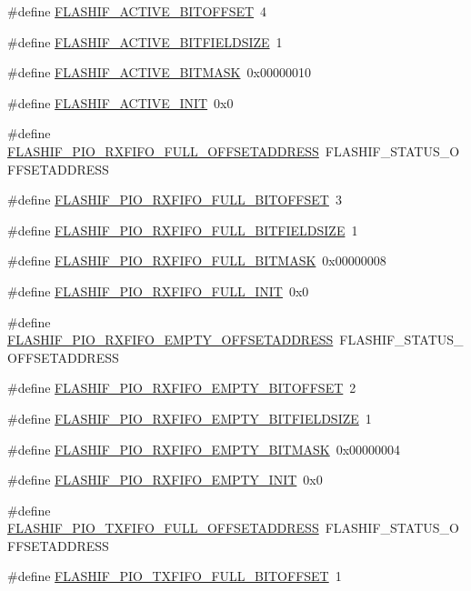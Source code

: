 \begin{DoxyCompactItemize}
\#define \hyperlink{a00552_acd738e4739f379e0dfe20a08b1a85a6b}{FLASHIF\_\-ACTIVE\_\-BITOFFSET}~4
\item 
\#define \hyperlink{a00552_ade782b81873774e78876fd84bc324984}{FLASHIF\_\-ACTIVE\_\-BITFIELDSIZE}~1
\item 
\#define \hyperlink{a00552_a96545928f0380808d4f094cb2ef87830}{FLASHIF\_\-ACTIVE\_\-BITMASK}~0x00000010
\item 
\#define \hyperlink{a00552_a4b7772e82adcff023ef6b6462452421b}{FLASHIF\_\-ACTIVE\_\-INIT}~0x0
\item 
\#define \hyperlink{a00552_a6aa4b02fe9a5eb7f485c61a8fe6ae998}{FLASHIF\_\-PIO\_\-RXFIFO\_\-FULL\_\-OFFSETADDRESS}~FLASHIF\_\-STATUS\_\-OFFSETADDRESS
\item 
\#define \hyperlink{a00552_a31379635fdfba4d57c5cf25757779291}{FLASHIF\_\-PIO\_\-RXFIFO\_\-FULL\_\-BITOFFSET}~3
\item 
\#define \hyperlink{a00552_ad5d64cb86f79fcdd6a4cbf1894a93574}{FLASHIF\_\-PIO\_\-RXFIFO\_\-FULL\_\-BITFIELDSIZE}~1
\item 
\#define \hyperlink{a00552_a8981b79bbe367e5bc38a5d7c4f66a2b2}{FLASHIF\_\-PIO\_\-RXFIFO\_\-FULL\_\-BITMASK}~0x00000008
\item 
\#define \hyperlink{a00552_a905ec907ee4f3e07b34b214d3a3727b5}{FLASHIF\_\-PIO\_\-RXFIFO\_\-FULL\_\-INIT}~0x0
\item 
\#define \hyperlink{a00552_aef706d52a4dc7b2dc37746ec65d080a5}{FLASHIF\_\-PIO\_\-RXFIFO\_\-EMPTY\_\-OFFSETADDRESS}~FLASHIF\_\-STATUS\_\-OFFSETADDRESS
\item 
\#define \hyperlink{a00552_a9eb1f9c9aee09bdaa20772586564311b}{FLASHIF\_\-PIO\_\-RXFIFO\_\-EMPTY\_\-BITOFFSET}~2
\item 
\#define \hyperlink{a00552_a3a6d53ec81b6570efae74f8755464bfe}{FLASHIF\_\-PIO\_\-RXFIFO\_\-EMPTY\_\-BITFIELDSIZE}~1
\item 
\#define \hyperlink{a00552_a3c0c2a74835767212171df4b5cbd00ae}{FLASHIF\_\-PIO\_\-RXFIFO\_\-EMPTY\_\-BITMASK}~0x00000004
\item 
\#define \hyperlink{a00552_a56946d23bace7a3a9644393c6d80c7b7}{FLASHIF\_\-PIO\_\-RXFIFO\_\-EMPTY\_\-INIT}~0x0
\item 
\#define \hyperlink{a00552_a40b63710b53ffc037d081ce3c627019b}{FLASHIF\_\-PIO\_\-TXFIFO\_\-FULL\_\-OFFSETADDRESS}~FLASHIF\_\-STATUS\_\-OFFSETADDRESS
\item 
\#define \hyperlink{a00552_a3d5d3f1369fa074a93c5e766eed6e0f2}{FLASHIF\_\-PIO\_\-TXFIFO\_\-FULL\_\-BITOFFSET}~1
\item 

\end{DoxyCompactItemize}
